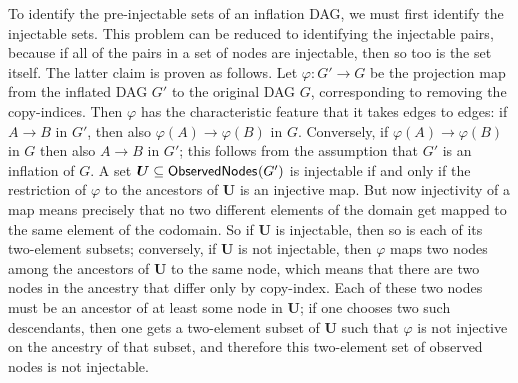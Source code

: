 \documentclass[aps,english,superscriptaddress,onecolumn,twoside,longbibliography,pra,floatfix,fleqn,nofootinbib]{revtex4-1}%
\theoremstyle{definition}
\newcommand{\SmallNamedFunction}[3][]{\operatorname{\mathsf{#2}}_{#1}\parenths{#3}}
\DeclarePairedDelimiter{\parenths}{\lparen}{\rparen}
\begin{document}
To identify the pre-injectable sets of an inflation DAG, we must first identify the injectable sets. This problem can be reduced to identifying the injectable pairs, because if all of the pairs in a set of nodes are injectable, then so too is the set itself.  The latter claim is proven as follows.   
Let $\varphi : G' \to G$ be the projection map from the inflated DAG $G'$ to
the original DAG $G$, corresponding to removing the copy-indices.  Then $\varphi$ has the characteristic feature that it takes edges to edges: if $A  \to B$ in $G'$, then also $\varphi(A) \to \varphi(B)$ in $G$. Conversely, if
$\varphi(A) \to \varphi(B)$ in $G$ then also $A \to B$ in $G'$; this follows from the
assumption that $G'$ is an inflation of $G$. 
A set $\bm{U} \subseteq \SmallNamedFunction{ObservedNodes}{G'}$ is injectable if and only if the
restriction of $\varphi$ to the ancestors of $\bm{U}$ is an injective map. 
But now injectivity of a map means precisely that no two different
elements of the domain get mapped to the same element of the codomain.
So if $\bm{U}$ is injectable, then so is each of its two-element subsets;
conversely, if $\bm{U}$ is not injectable, then $\varphi$ maps two nodes among the
ancestors of $\bm{U}$ to the same node, which means that there are two nodes in the
ancestry that differ only by copy-index. Each of these two nodes must be
an ancestor of at least some node in $\bm{U}$; if one chooses two such
descendants, then one gets a two-element subset of $\bm{U}$ such that $\varphi$ is not
injective on the ancestry of that subset, and therefore this two-element
set of observed nodes is not injectable.
\color{black}
\end{document}
